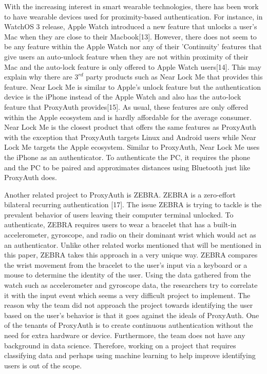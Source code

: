 \documentclass[letterpaper,twocolumn,10pt]{article}
\begin{document}
With the increasing interest in smart wearable technologies, there has been work to have wearable devices used for proximity-based authentication. For instance, in WatchOS 3 release, Apple Watch introduced a new feature that unlocks a user's Mac when they are close to their Macbook[13]. However, there does not seem to be any feature within the Apple Watch nor any of their 'Continuity' features that give users an auto-unlock feature when they are not within proximity of their Mac and the auto-lock feature is only offered to Apple Watch users[14]. This may explain why there are $3^{rd}$ party products such as Near Lock Me that provides this feature. Near Lock Me is similar to Apple's unlock feature but the authentication device is the iPhone instead of the Apple Watch and also has the auto-lock feature that ProxyAuth provides[15]. As usual, these features are only offered within the Apple ecosystem and is hardly affordable for the average consumer. Near Lock Me is the closest product that offers the same features as ProxyAuth with the exception that ProxyAuth targets Linux and Android users while Near Lock Me targets the Apple ecosystem. Similar to ProxyAuth, Near Lock Me uses the iPhone as an authenticator. To authenticate the PC, it requires the phone and the PC to be paired and approximates distances using Bluetooth just like ProxyAuth does.

Another related project to ProxyAuth is ZEBRA. ZEBRA is a zero-effort bilateral recurring authentication [17]. The issue ZEBRA is trying to tackle is the prevalent behavior of users leaving their computer terminal unlocked. To authenticate, ZEBRA requires users to wear a bracelet that has a built-in accelerometer, gyroscope, and radio on their dominant wrist which would act as an authenticator. Unlike other related works mentioned that will be mentioned in this paper, ZEBRA takes this approach in a very unique way. ZEBRA compares the wrist movement from the bracelet to the user's input via a keyboard or a mouse to determine the identity of the user. Using the data gathered from the watch such as accelerometer and gyroscope data, the researchers try to correlate it with the input event which seems a very difficult project to implement. The reason why the team did not approach the project towards identifying the user based on the user's behavior is that it goes against the ideals of ProxyAuth. One of the tenants of ProxyAuth is to create continuous authentication without the need for extra hardware or device. Furthermore, the team does not have any background in data science. Therefore, working on a project that requires classifying data and perhaps using machine learning to help improve identifying users is out of the scope.
\end{document}
